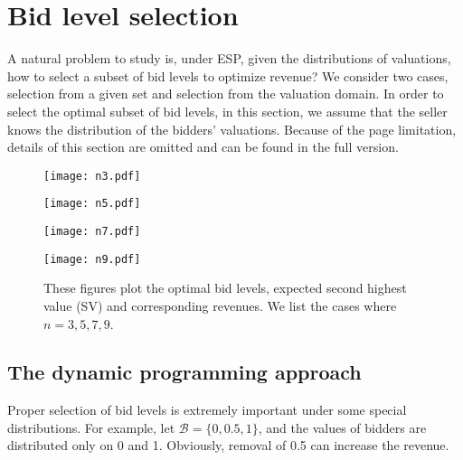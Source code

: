 \documentclass[letterpaper]{article}
\begin{document}
\section{Bid level selection}\label{sec:sel}

A natural problem to study is, under ESP, given the distributions of valuations, how to select a subset of bid levels to optimize revenue?
We consider two cases, selection from a given set and selection from the valuation domain. In order to select the optimal subset of bid levels, in this section, we assume that the seller knows the distribution of the bidders' valuations.
Because of the page limitation, details of this section are omitted and can be found in the full version.


\begin{figure*}[t]
	\centering
	\begin{minipage}[t]{0.5\linewidth}
		\centering
		\texttt{[image: n3.pdf]}
	\end{minipage}%
	\begin{minipage}[t]{0.5\linewidth}
		\centering
		\texttt{[image: n5.pdf]}
	\end{minipage} 
	\begin{minipage}[t]{0.5\linewidth}
		\centering
		\texttt{[image: n7.pdf]}
	\end{minipage}%
	\begin{minipage}[t]{0.5\linewidth}
		\centering
		\texttt{[image: n9.pdf]}
	\end{minipage} 
	\caption{These figures plot the optimal bid levels, expected second highest value (SV) and corresponding revenues. We list the cases where $n=3,5,7,9$.}
	\label{fig:level}
\end{figure*}

\subsection{The dynamic programming approach}

Proper selection of bid levels is extremely important under some special distributions.
For example, let $\mathcal{B}=\{0,0.5,1\}$, and the values of bidders are distributed only on 0 and 1.
Obviously, removal of 0.5 can increase the revenue.
\end{document}

